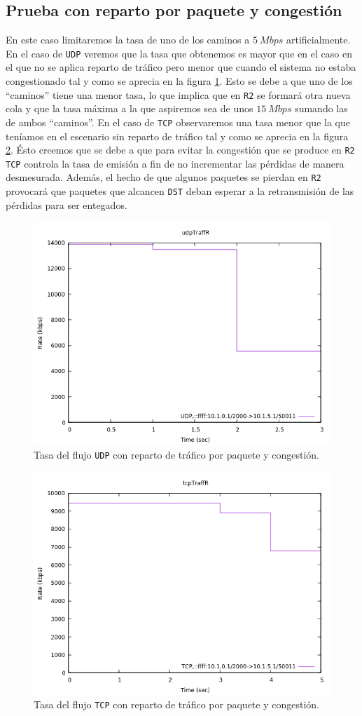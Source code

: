 \documentclass[11pt]{article}
\begin{document}
        \subsection{Prueba con reparto por paquete y congestión}
            En este caso limitaremos la tasa de uno de los caminos a $5\ Mbps$ artificialmente. En el caso de \texttt{UDP} veremos que la tasa que obtenemos es mayor que en el caso en el que no se aplica reparto de tráfico pero menor que cuando el sistema no estaba congestionado tal y como se aprecia en la figura \ref{fig:udpTraffCongR}. Esto se debe a que uno de los ``caminos'' tiene una menor tasa, lo que implica que en \texttt{R2} se formará otra nueva cola y que la tasa máxima a la que aspiremos sea de unos $15\ Mbps$ sumando las de ambos ``caminos''. En el caso de \texttt{TCP} observaremos una tasa menor que la que teníamos en el escenario sin reparto de tráfico tal y como se aprecia en la figura \ref{fig:tcpTraffCongR}. Ésto creemos que se debe a que para evitar la congestión que se produce en \texttt{R2} \texttt{TCP} controla la tasa de emisión a fin de no incrementar las pérdidas de manera desmesurada. Además, el hecho de que algunos paquetes se pierdan en \texttt{R2} provocará que paquetes que alcancen \texttt{DST} deban esperar a la retransmisión de las pérdidas para ser entegados.

            \begin{figure}
                \centering
                \includegraphics[width=0.6\linewidth]{udpTraffCongR.png}
                \caption{Tasa del flujo \texttt{UDP} con reparto de tráfico por paquete y congestión.}
                \label{fig:udpTraffCongR}
            \end{figure}

            \begin{figure}
                \centering
                \includegraphics[width=0.6\linewidth]{tcpTraffCongR.png}
                \caption{Tasa del flujo \texttt{TCP} con reparto de tráfico por paquete y congestión.}
                \label{fig:tcpTraffCongR}
            \end{figure}
\end{document}
